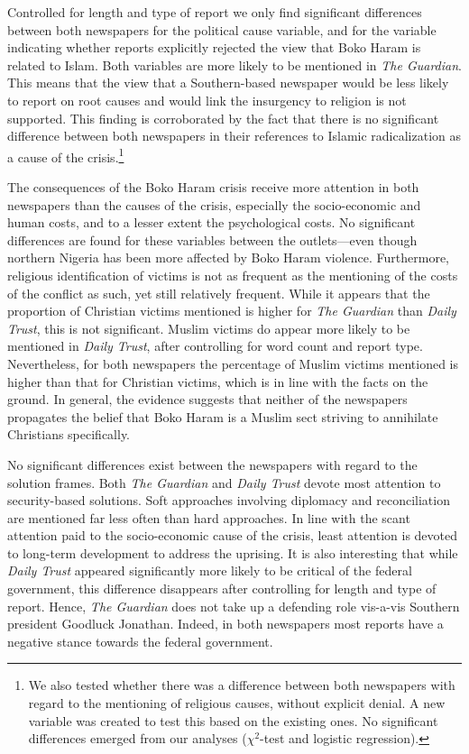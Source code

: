 Controlled for length and type of report we only find significant differences between both newspapers for the political cause variable, and for the variable indicating whether reports explicitly rejected the view that Boko Haram is related to Islam. Both variables are more likely to be mentioned in \textit{The Guardian}. This means that the view that a Southern-based newspaper would be less likely to report on root causes and would link the insurgency to religion is not supported. This finding is corroborated by the fact that there is no significant difference between both newspapers in their references to Islamic radicalization as a cause of the crisis.\footnote{We also tested whether there was a difference between both newspapers with regard to the mentioning of religious causes, without explicit denial. A new variable was created to test this based on the existing ones. No significant differences emerged from our analyses ($\chi^2$-test and logistic regression).}


The consequences of the Boko Haram crisis receive more attention in both newspapers than the causes of the crisis, especially the socio-economic and human costs, and to a lesser extent the psychological costs. No significant differences are found for these variables between the outlets---even though northern Nigeria has been more affected by Boko Haram violence. Furthermore, religious identification of victims is not as frequent as the mentioning of the costs of the conflict as such, yet still relatively frequent. While it appears that the proportion of Christian victims mentioned is higher for \textit{The Guardian} than \textit{Daily Trust}, this is not significant. Muslim victims do appear more likely to be mentioned in \textit{Daily Trust}, after controlling for word count and report type. Nevertheless, for both newspapers the percentage of Muslim victims mentioned is higher than that for Christian victims, which is in line with the facts on the ground. In general, the evidence suggests that neither of the newspapers propagates the belief that Boko Haram is a Muslim sect striving to annihilate Christians specifically.


No significant differences exist between the newspapers with regard to the solution frames. Both \textit{The Guardian} and \textit{Daily Trust} devote most attention to security-based solutions. Soft approaches involving diplomacy and reconciliation are mentioned far less often than hard approaches. In line with the scant attention paid to the socio-economic cause of the crisis, least attention is devoted to long-term development to address the uprising. It is also interesting that while \textit{Daily Trust} appeared significantly more likely to be critical of the federal government, this difference disappears after controlling for length and type of report. Hence, \textit{The Guardian} does not take up a defending role vis-a-vis Southern president Goodluck Jonathan. Indeed, in both newspapers most reports have a negative stance towards the federal government. 


